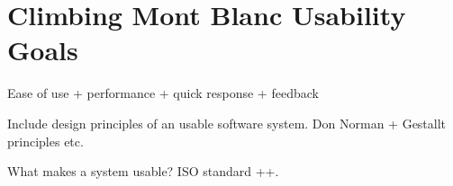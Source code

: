 \chapter{Climbing Mont Blanc Usability Goals}

Ease of use + performance + quick response + feedback

Include design principles of an usable software system. Don Norman + Gestallt principles etc.

What makes a system usable? ISO standard ++.
